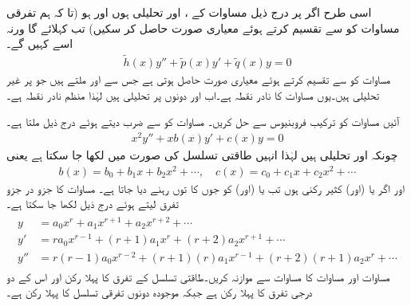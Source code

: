 اسی طرح اگر   پر درج ذیل مساوات کے ،  اور  تحلیلی ہوں اور  ہو (تا کہ ہم تفرقی مساوات کو  سے تقسیم کرتے ہوئے  معیاری صورت حاصل  کر سکیں) تب   کہلائے گا  ورنہ اسے   کہیں گے۔ 
\begin{align*}
\tilde{h}(x)y''+\tilde{p}(x)y'+\tilde{q}(x)y=0
\end{align*}
مساوات  کو  سے تقسیم کرتے ہوئے معیاری صورت حاصل ہوتی ہے جس سے  اور  ملتے ہیں جو  پر غیر تحلیلی ہیں۔یوں  مساوات کا نادر نقطہ ہے۔اب  اور  دونوں    پر تحلیلی ہیں لہٰذا  منظم نادر نقطہ ہے۔ 

آئیں مساوات  کو ترکیب فروبنیوس سے حل کریں۔ مساوات  کو  سے ضرب دیتے ہوئے درج ذیل ملتا ہے۔
\begin{align}\label{مساوات_طاقتی_فروبنیوس_پ}
x^2y''+xb(x)y'+c(x)y=0
\end{align}
چونکہ  اور  تحلیلی ہیں لہٰذا انہیں طاقتی تسلسل کی صورت میں لکھا جا سکتا ہے یعنی
\begin{align*}
b(x)=b_0+b_1x+b_2x^2+\cdots, \quad c(x)=c_0+c_1x+c_2x^2+\cdots
\end{align*}
اور اگر  یا (اور)  کثیر رکنی ہوں تب  یا (اور)  کو  جوں کا توں رہنے دیا جاتا ہے۔ مساوات  کا جزو در جزو تفرق لیتے ہوئے درج ذیل لکھا جا سکتا ہے۔
\begin{gather}
\begin{aligned}\label{مساوات_بیسل_فروبنیوس_عمومی_تفرقات}
y&=a_0x^r+a_1x^{r+1}+a_2x^{r+2}+\cdots\\
y'&=ra_0x^{r-1}+(r+1)a_1x^{r}+(r+2)a_2x^{r+1}+\cdots\\
y''&=r(r-1)a_0x^{r-2}+(r+1)(r)a_1x^{r-1}+(r+2)(r+1)a_2x^{r}+\cdots
\end{aligned}
\end{gather}
مساوات  اور مساوات  کا مساوات  سے موازنہ کریں۔طاقتی تسلسل  کے تفرق  کا پہلا رکن   اور اس کے دو درجی تفرق کا پہلا رکن  ہے جبکہ موجودہ دونوں تفرقی تسلسل کا پہلا رکن  ہے۔ 

